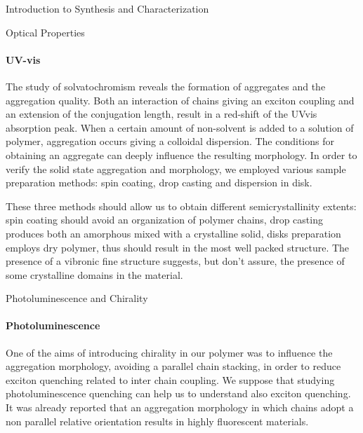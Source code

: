 \begin{section}{Introduction to Synthesis and Characterization}
\begin{subsection}{Optical Properties}
\paragraph{UV-vis} 
The study of solvato\-chromism reveals the formation of aggregates and the aggregation quality. Both an interaction of chains giving an exciton coupling and an extension of the conjugation length, result in a red-shift of the \gls{UVvis} absorption peak. When a certain amount of non-solvent is added to a solution of polymer, aggregation occurs giving a colloidal dispersion. The conditions for obtaining an aggregate can deeply influence the resulting morphology. 
In order to verify the solid state aggregation and morphology, we employed various sample preparation methods: spin coating, drop casting and dispersion in  disk. 

These three methods should allow us to obtain different semi\-crystallinity extents: spin coating should avoid an organization of polymer chains, drop casting produces both an amorphous mixed with a crystalline solid,  disks preparation employs dry polymer, thus should result in the most well packed structure. The presence of a vibronic fine structure suggests, but don't assure, the presence of some crystalline domains in the material.

\end{subsection}
\begin{subsection}{Photoluminescence and Chirality}
\paragraph{Photoluminescence} One of the aims of introducing chirality in our polymer was to influence the aggregation morphology, avoiding a parallel chain stacking, in order to reduce exciton quenching related to inter chain coupling. We suppose that studying photoluminescence quenching can help us to understand also exciton quenching. It was already reported that an aggregation morphology in which chains adopt a non parallel relative orientation results in highly fluorescent materials.%


\end{subsection}
\end{section}
